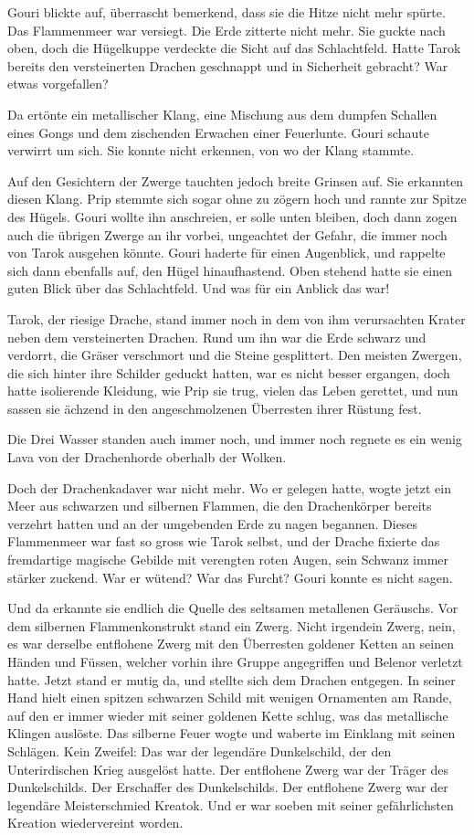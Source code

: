\documentclass[10pt, a4paper, oneside]{book}
\begin{document}
Gouri blickte auf, überrascht bemerkend, dass sie die Hitze nicht mehr spürte. Das Flammenmeer war versiegt. Die Erde zitterte nicht mehr. Sie guckte nach oben, doch die Hügelkuppe verdeckte die Sicht auf das Schlachtfeld. Hatte Tarok bereits den versteinerten Drachen geschnappt und in Sicherheit gebracht? War etwas vorgefallen?

Da ertönte ein metallischer Klang, eine Mischung aus dem dumpfen Schallen eines Gongs und dem zischenden Erwachen einer Feuerlunte. Gouri schaute verwirrt um sich. Sie konnte nicht erkennen, von wo der Klang stammte.

Auf den Gesichtern der Zwerge tauchten jedoch breite Grinsen auf. Sie erkannten diesen Klang. Prip stemmte sich sogar ohne zu zögern hoch und rannte zur Spitze des Hügels. Gouri wollte ihn anschreien, er solle unten bleiben, doch dann zogen auch die übrigen Zwerge an ihr vorbei, ungeachtet der Gefahr, die immer noch von Tarok ausgehen könnte. Gouri haderte für einen Augenblick, und rappelte sich dann ebenfalls auf, den Hügel hinaufhastend. Oben stehend hatte sie einen guten Blick über das Schlachtfeld. Und was für ein Anblick das war!

Tarok, der riesige Drache, stand immer noch in dem von ihm verursachten Krater neben dem versteinerten Drachen. Rund um ihn war die Erde schwarz und verdorrt, die Gräser verschmort und die Steine gesplittert. Den meisten Zwergen, die sich hinter ihre Schilder geduckt hatten, war es nicht besser ergangen, doch hatte isolierende Kleidung, wie Prip sie trug, vielen das Leben gerettet, und nun sassen sie ächzend in den angeschmolzenen Überresten ihrer Rüstung fest.

Die Drei Wasser standen auch immer noch, und immer noch regnete es ein wenig Lava von der Drachenhorde oberhalb der Wolken.

Doch der Drachenkadaver war nicht mehr. Wo er gelegen hatte, wogte jetzt ein Meer aus schwarzen und silbernen Flammen, die den Drachenkörper bereits verzehrt hatten und an der umgebenden Erde zu nagen begannen. Dieses Flammenmeer war fast so gross wie Tarok selbst, und der Drache fixierte das fremdartige magische Gebilde mit verengten roten Augen, sein Schwanz immer stärker zuckend. War er wütend? War das Furcht? Gouri konnte es nicht sagen.

Und da erkannte sie endlich die Quelle des seltsamen metallenen Geräuschs. Vor dem silbernen Flammenkonstrukt stand ein Zwerg. Nicht irgendein Zwerg, nein, es war derselbe entflohene Zwerg mit den Überresten goldener Ketten an seinen Händen und Füssen, welcher vorhin ihre Gruppe angegriffen und Belenor verletzt hatte. Jetzt stand er mutig da, und stellte sich dem Drachen entgegen. In seiner Hand hielt einen spitzen schwarzen Schild mit wenigen Ornamenten am Rande, auf den er immer wieder mit seiner goldenen Kette schlug, was das metallische Klingen auslöste. Das silberne Feuer wogte und waberte im Einklang mit seinen Schlägen. Kein Zweifel: Das war der legendäre Dunkelschild, der den Unterirdischen Krieg ausgelöst hatte. Der entflohene Zwerg war der Träger des Dunkelschilds. Der Erschaffer des Dunkelschilds. Der entflohene Zwerg war der legendäre Meisterschmied Kreatok. Und er war soeben mit seiner gefährlichsten Kreation wiedervereint worden.
\end{document}
